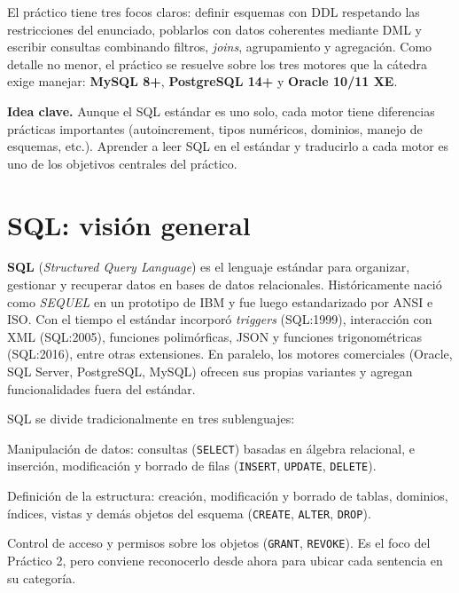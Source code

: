 \documentclass[11pt,a4paper]{article}
\begin{document}
El práctico tiene tres focos claros: definir esquemas con DDL respetando las
restricciones del enunciado, poblarlos con datos coherentes mediante DML y
escribir consultas combinando filtros, \emph{joins}, agrupamiento y agregación.
Como detalle no menor, el práctico se resuelve sobre los tres motores que la
cátedra exige manejar: \textbf{MySQL 8+}, \textbf{PostgreSQL 14+} y
\textbf{Oracle 10/11 XE}.

\begin{nota}
\textbf{Idea clave.} Aunque el SQL estándar es uno solo, cada motor tiene
diferencias prácticas importantes (autoincrement, tipos numéricos, dominios,
manejo de esquemas, etc.). Aprender a leer SQL en el estándar y traducirlo
a cada motor es uno de los objetivos centrales del práctico.
\end{nota}

\section{SQL: visión general}

\textbf{SQL} (\emph{Structured Query Language}) es el lenguaje estándar para
organizar, gestionar y recuperar datos en bases de datos relacionales.
Históricamente nació como \emph{SEQUEL} en un prototipo de IBM y fue luego
estandarizado por ANSI e ISO. Con el tiempo el estándar incorporó
\emph{triggers} (SQL:1999), interacción con XML (SQL:2005), funciones
polimórficas, JSON y funciones trigonométricas (SQL:2016), entre otras
extensiones. En paralelo, los motores comerciales (Oracle, SQL Server,
PostgreSQL, MySQL) ofrecen sus propias variantes y agregan funcionalidades
fuera del estándar.

SQL se divide tradicionalmente en tres sublenguajes:

\begin{description}[leftmargin=2.2cm,style=nextline]
    \item[\textbf{DML} (Data Manipulation Language)]
    Manipulación de datos: consultas (\texttt{SELECT}) basadas en álgebra
    relacional, e inserción, modificación y borrado de filas
    (\texttt{INSERT}, \texttt{UPDATE}, \texttt{DELETE}).

    \item[\textbf{DDL} (Data Definition Language)]
    Definición de la estructura: creación, modificación y borrado de tablas,
    dominios, índices, vistas y demás objetos del esquema
    (\texttt{CREATE}, \texttt{ALTER}, \texttt{DROP}).

    \item[\textbf{DCL} (Data Control Language)]
    Control de acceso y permisos sobre los objetos
    (\texttt{GRANT}, \texttt{REVOKE}). Es el foco del Práctico 2,
    pero conviene reconocerlo desde ahora para ubicar cada sentencia
    en su categoría.
\end{description}
\end{document}
